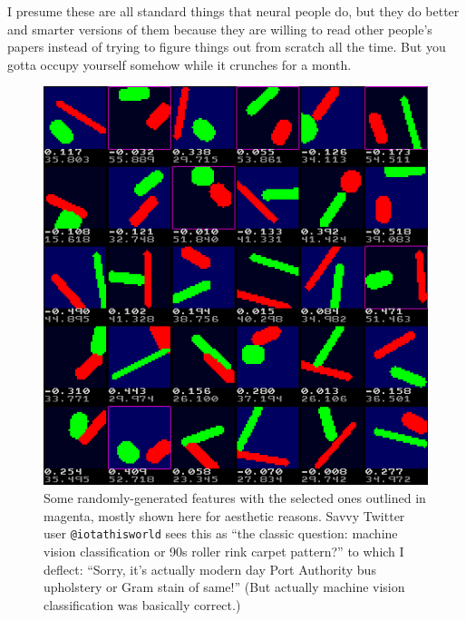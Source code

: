 \documentclass[twocolumn]{article}
\begin{document}
I presume these are all standard things that neural people do, but they
do better and smarter versions of them because they are willing to
read other people's papers instead of trying to figure things out from
scratch all the time. But you gotta occupy yourself somehow while it
crunches for a month.


\begin{figure}[ht]
\centering
  \includegraphics[width=0.99 \linewidth]{makefeatures}
  \caption{ Some randomly-generated features with the selected ones
    outlined in magenta, mostly shown here for aesthetic reasons.
    Savvy Twitter user {\tt @iotathisworld} sees this as ``the classic
    question: machine vision classification or 90s roller rink carpet
    pattern?'' to which I deflect: ``Sorry, it's actually modern day
    Port Authority bus upholstery or Gram stain of same!'' (But
    actually machine vision classification was basically correct.)
  } \label{fig:makefeatures}
\end{figure}
\end{document}
